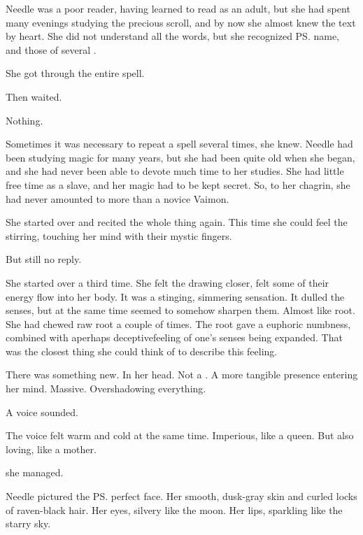 Needle was a poor reader, having learned to read as an adult, but she had spent many evenings studying the precious scroll, and by now she almost knew the text by heart. 
She did not understand all the words, but she recognized \ps{\Achsah}{} name, and those of several \qliphoth. 

She got through the entire spell. 

Then waited. 

Nothing. 

Sometimes it was necessary to repeat a spell several times, she knew. 
Needle had been studying magic for many years, but she had been quite old when she began, and she had never been able to devote much time to her studies. 
She had little free time as a slave, and her magic had to be kept secret. 
So, to her chagrin, she had never amounted to more than a novice Vaimon. 

She started over and recited the whole thing again. 
This time she could feel the \qliphoth{} stirring, touching her mind with their mystic fingers. 

But still no reply. 


She started over a third time. 
She felt the \qliphoth{} drawing closer, felt some of their energy flow into her body. 
It was a stinging, simmering sensation. 
It dulled the senses, but at the same time seemed to somehow sharpen them. 
Almost like \dvingen{} root. 
She had chewed raw \dvingen{} root a couple of times. 
The root gave a euphoric numbness, combined with a\dash perhaps deceptive\dash feeling of one's senses being expanded. 
That was the closest thing she could think of to describe this feeling. 


There was something new. 
In her head. 
Not a \qliphah. 
A more tangible presence entering her mind. 
Massive. 
Overshadowing everything. 

A voice sounded. 


The voice felt warm and cold at the same time. 
Imperious, like a queen. 
But also loving, like a mother. 

 she managed. 


Needle pictured the \ps{\resvil} perfect face. 
Her smooth, dusk-gray skin and curled locks of raven-black hair. 
Her eyes, silvery like the moon. 
Her lips, sparkling like the starry sky. 

